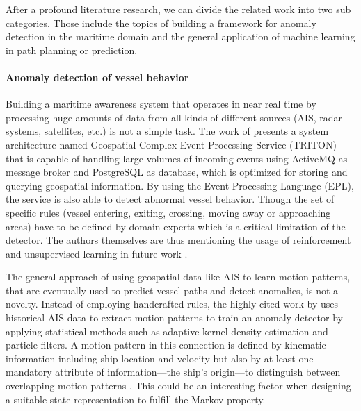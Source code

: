 After a profound literature research, we can divide the related work into two sub categories. Those include the topics of building a framework for anomaly detection in the maritime domain and the general application of machine learning in path planning or prediction.

\par 
\paragraph{Anomaly detection of vessel behavior}
Building a maritime awareness system that operates in near real time by processing huge amounts of data from all kinds of different sources (AIS, radar systems, satellites, etc.) is not a simple task. The work of \cite{tsogas2019geospatial} presents a system architecture named Geospatial Complex Event Processing Service (TRITON) that is capable of handling large volumes of incoming events using ActiveMQ as message broker and PostgreSQL as database, which is optimized for storing and querying geospatial information. By using the Event Processing Language (EPL), the service is also able to detect abnormal vessel behavior. Though the set of specific rules (vessel entering, exiting, crossing, moving away or approaching areas) have to be defined by domain experts \cite[p.~4]{tsogas2019geospatial} which is a critical limitation of the detector. The authors themselves are thus mentioning the usage of reinforcement and unsupervised learning in future work \cite[p.~9]{tsogas2019geospatial}.
\par 
The general approach of using geospatial data like AIS to learn motion patterns, that are eventually used to predict vessel paths and detect anomalies, is not a novelty. Instead of employing handcrafted rules, the highly cited work by \cite{ristic2008statistical} uses historical AIS data to extract motion patterns to train an anomaly detector by applying statistical methods such as adaptive kernel density estimation and particle filters. A motion pattern in this connection is defined by kinematic information including ship location and velocity but also by at least one mandatory attribute of information—the ship's origin—to distinguish between overlapping motion patterns \cite[p.~2]{ristic2008statistical}. This could be an interesting factor when designing a suitable state representation to fulfill the Markov property.

